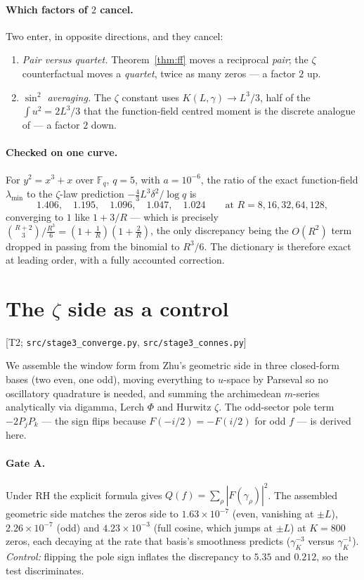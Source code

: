 \documentclass[11pt,a4paper]{article}
\theoremstyle{definition}
\theoremstyle{remark}
\newcommand{\tier}[1]{{\small\textsf{[#1]}}}
\newcommand{\lmin}{\lambda_{\min}}
\newcommand{\Fq}{\mathbb{F}_q}
\newcommand{\src}[1]{{\footnotesize\texttt{#1}}}
\begin{document}
\paragraph{Which factors of $2$ cancel.} Two enter, in opposite directions, and they cancel:
\begin{enumerate}\itemsep1pt
\item \emph{Pair versus quartet.} Theorem~\ref{thm:ff} moves a reciprocal \emph{pair}; the
$\zeta$ counterfactual moves a \emph{quartet}, twice as many zeros --- a factor $2$ up.
\item \emph{$\sin^{2}$ averaging.} The $\zeta$ constant uses
$K(L,\gamma)\to L^{3}/3$, half of the $\int u^{2}=2L^{3}/3$ that the function-field centred
moment is the discrete analogue of --- a factor $2$ down.
\end{enumerate}

\paragraph{Checked on one curve.} For $y^{2}=x^{3}+x$ over $\Fq$, $q=5$, with
$a=10^{-6}$, the ratio of the exact function-field $\lmin$ to the $\zeta$-law prediction
$-\tfrac{4}{3}L^{3}\delta^{2}/\log q$ is
\[
1.406,\quad 1.195,\quad 1.096,\quad 1.047,\quad 1.024
\qquad\text{at } R=8,16,32,64,128,
\]
converging to $1$ like $1+3/R$ --- which is precisely
$\binom{R+2}{3}\big/\tfrac{R^{3}}{6}=(1+\tfrac1R)(1+\tfrac2R)$, the only discrepancy being
the $O(R^{2})$ term dropped in passing from the binomial to $R^{3}/6$. The dictionary is
therefore exact at leading order, with a fully accounted correction.

\section{The $\zeta$ side as a control}\label{sec:zeta}
\tier{T2; \src{src/stage3\_converge.py}, \src{src/stage3\_connes.py}}

We assemble the window form from Zhu's geometric side in three closed-form bases (two even,
one odd), moving everything to $u$-space by Parseval so no oscillatory quadrature is needed,
and summing the archimedean $m$-series analytically via digamma, Lerch $\Phi$ and Hurwitz
$\zeta$. The odd-sector pole term $-2P_jP_k$ --- the sign flips because
$F(-i/2)=-F(i/2)$ for odd $f$ --- is derived here.

\paragraph{Gate A.} Under RH the explicit formula gives
$Q(f)=\sum_\rho|F(\gamma_\rho)|^{2}$. The assembled geometric side matches the zeros side to
$1.63\times10^{-7}$ (even, vanishing at $\pm L$), $2.26\times10^{-7}$ (odd) and
$4.23\times10^{-3}$ (full cosine, which jumps at $\pm L$) at $K=800$ zeros, each decaying at
the rate that basis's smoothness predicts ($\gamma_K^{-3}$ versus $\gamma_K^{-1}$).
\emph{Control:} flipping the pole sign inflates the discrepancy to $5.35$ and $0.212$, so the
test discriminates.
\end{document}
